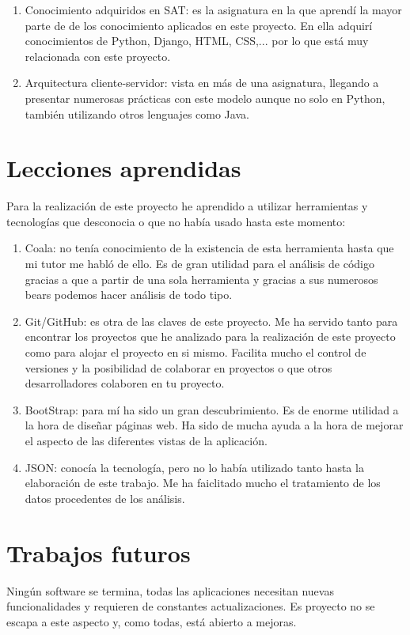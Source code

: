 \documentclass[a4paper, 12pt]{book}
\begin{document}
\begin{enumerate}
  \item Conocimiento adquiridos en SAT: es la asignatura en la que aprendí la mayor parte de de los conocimiento aplicados en este proyecto. En ella adquirí conocimientos de Python, Django, HTML, CSS,... por lo que está muy relacionada con este proyecto.
  \item Arquitectura cliente-servidor: vista en más de una asignatura, llegando a presentar numerosas prácticas con este modelo aunque no solo en Python, también utilizando otros lenguajes como Java.
\end{enumerate}


\section{Lecciones aprendidas}
\label{sec:lecciones_aprendidas}
Para la realización de este proyecto he aprendido a utilizar herramientas y tecnologías que desconocia o que no había usado hasta este momento:

\begin{enumerate}
  \item Coala: no tenía conocimiento de la existencia de esta herramienta hasta que mi tutor me habló de ello. Es de gran utilidad para el análisis de código gracias a que a partir de una sola herramienta y gracias a sus numerosos bears podemos hacer análisis de todo tipo.
  \item Git/GitHub: es otra de las claves de este proyecto. Me ha servido tanto para encontrar los proyectos que he analizado para la realización de este proyecto como para alojar el proyecto en si mismo. Facilita mucho el control de versiones y la posibilidad de colaborar en proyectos o que otros desarrolladores colaboren en tu proyecto.
  \item BootStrap: para mí ha sido un gran descubrimiento. Es de enorme utilidad a la hora de diseñar páginas web. Ha sido de mucha ayuda a la hora de mejorar el aspecto de las diferentes vistas de la aplicación.
  \item JSON: conocía la tecnología, pero no lo había utilizado tanto hasta la elaboración de este trabajo. Me ha faiclitado mucho el tratamiento de los datos procedentes de los análisis.
\end{enumerate}


\section{Trabajos futuros}
\label{sec:trabajos_futuros}
Ningún software se termina, todas las aplicaciones necesitan nuevas funcionalidades y requieren de constantes actualizaciones. Es proyecto no se escapa a este aspecto y, como todas, está abierto a mejoras.
\end{document}
